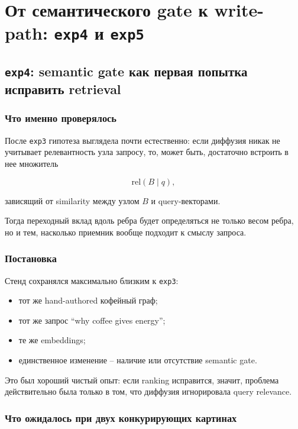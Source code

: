 \chapter{От семантического gate к write-path: \texttt{exp4} и \texttt{exp5}}

\section{\texttt{exp4}: semantic gate как первая попытка исправить retrieval}

\subsection{Что именно проверялось}

После \texttt{exp3} гипотеза выглядела почти естественно: если диффузия никак не
учитывает релевантность узла запросу, то, может быть, достаточно встроить в нее
множитель

\[
\mathrm{rel}(B\mid q),
\]

зависящий от similarity между узлом $B$ и query-векторами.

Тогда переходный вклад вдоль ребра будет определяться не только весом ребра, но
и тем, насколько приемник вообще подходит к смыслу запроса.

\subsection{Постановка}

Стенд сохранялся максимально близким к \texttt{exp3}:

\begin{itemize}[leftmargin=2em]
\item тот же hand-authored кофейный граф;
\item тот же запрос ``why coffee gives energy'';
\item те же embeddings;
\item единственное изменение -- наличие или отсутствие semantic gate.
\end{itemize}

Это был хороший чистый опыт: если ranking исправится, значит, проблема
действительно была только в том, что диффузия игнорировала query relevance.

\subsection{Что ожидалось при двух конкурирующих картинах}

